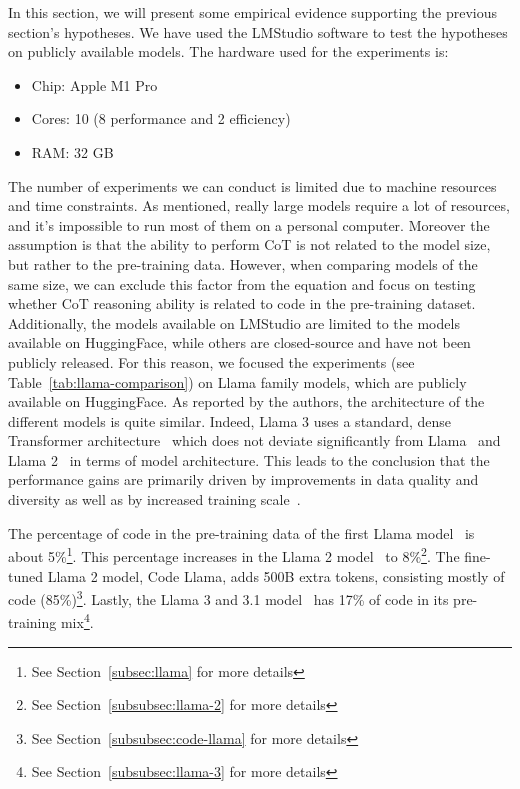 In this section, we will present some empirical evidence supporting the previous section's hypotheses.
We have used the LMStudio\cite{lmstudio} software to test the hypotheses on publicly available models.
The hardware used for the experiments is:
\begin{itemize}
	\item Chip: Apple M1 Pro
	\item Cores: 10 (8 performance and 2 efficiency)
	\item RAM: 32 GB
\end{itemize}

The number of experiments we can conduct is limited due to machine resources and time constraints.
As mentioned, really large models require a lot of resources, and it's impossible to run most of them on a personal computer.
Moreover the assumption is that the ability to perform CoT is not related to the model size, but rather to the pre-training data.
However, when comparing models of the same size, we can exclude this factor from the equation and focus on testing whether CoT reasoning ability is related to code in the pre-training dataset.
Additionally, the models available on LMStudio are limited to the models available on HuggingFace, while others are closed-source and have not been publicly released.
For this reason, we focused the experiments (see Table~\ref{tab:llama-comparison}) on Llama family models, which are publicly available on HuggingFace.
As reported by the authors, the architecture of the different models is quite similar.
Indeed, Llama 3 uses a standard, dense Transformer architecture~\cite{vaswani2023attention} which does not deviate significantly from Llama~\cite{touvron2023llama} and Llama 2~\cite{touvron2023llama2} in terms of model architecture.
This leads to the conclusion that the performance gains are primarily driven by improvements in data quality and diversity as well as by increased training scale~\cite{llama3}.

The percentage of code in the pre-training data of the first Llama model~\cite{touvron2023llama} is about 5\%\footnote{See Section~\ref{subsec:llama} for more details}.
This percentage increases in the Llama 2 model~\cite{touvron2023llama2} to 8\%\footnote{See Section~\ref{subsubsec:llama-2} for more details}.
The fine-tuned Llama 2 model, Code Llama\cite{roziere2024codellamaopenfoundation}, adds 500B extra tokens, consisting mostly of code (85\%)\footnote{See Section~\ref{subsubsec:code-llama} for more details}.
Lastly, the Llama 3 and 3.1 model~\cite{llama3} has 17\% of code in its pre-training mix\footnote{See Section~\ref{subsubsec:llama-3} for more details}.

